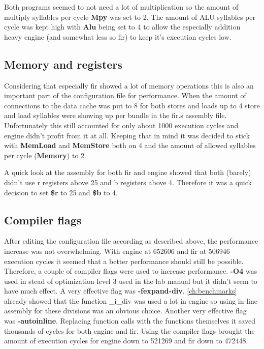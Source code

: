 Both programs seemed to not need a lot of multiplication so the amount of multiply syllables per cycle \textbf{Mpy} was set to 2. The amount of ALU syllables per cycle was kept high with \textbf{Alu} being set to 4 to allow the especially addition heavy engine (and somewhat less so fir) to keep it's execution cycles low.

\subsection{Memory and registers}
Considering that especially fir showed a lot of memory operations this is also an important part of the configuration file for performance. When the amount of connections to the data cache was put to 8 for both stores and loads up to 4 store and load syllables were showing up per bundle in the fir.s assembly file. Unfortunately this still accounted for only about 1000 execution cycles and engine didn't profit from it at all. Keeping that in mind it was decided to stick with \textbf{MemLoad} and \textbf{MemStore} both on 4 and the amount of allowed syllables per cycle (\textbf{Memory}) to 2.

A quick look at the assembly for both fir and engine showed that both (barely) didn't use r registers above 25 and b registers above 4. Therefore it was a quick decision to set \textbf{\$r} to 25 and \textbf{\$b} to 4.

\subsection{Compiler flags}
After editing the configuration file according as described above, the performance increase was not overwhelming. With engine at 652606 and fir at 506946 execution cycles it seemed that a better performance should still be possible. Therefore, a couple of compiler flags were used to increase performance. \textbf{-O4} was used in stead of optimization level 3 used in the lab manual but it didn't seem to have much effect. A very effective flag was \textbf{-fexpand-div}. \cref{ch:benchmarks} already showed that the function \_i\_div was used a lot in engine so using in-line assembly for these divisions was an obvious choice. Another very effective flag was \textbf{-autoinline}. Replacing function calls with the functions themselves it saved thousands of cycles for both engine and fir. Using the compiler flags brought the amount of execution cycles for engine down to 521269 and fir down to 472448.

